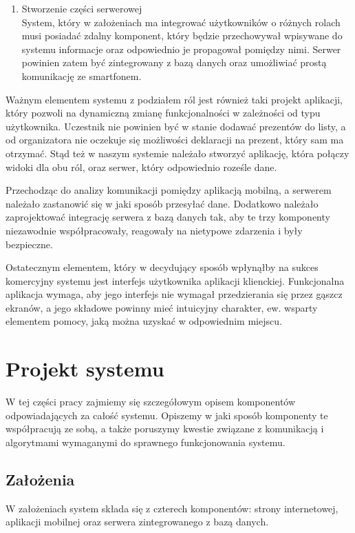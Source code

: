 \documentclass[12pt,titlepage]{article}
\begin{document}
\begin{enumerate}
 \item Stworzenie części serwerowej
 \\ System, który w założeniach ma integrować użytkowników o różnych rolach musi posiadać zdalny komponent, który będzie przechowywał wpisywane do systemu informacje
 oraz odpowiednio je propagował pomiędzy nimi. Serwer powinien zatem być zintegrowany z bazą danych oraz umożliwiać prostą komunikację ze smartfonem.
\end{enumerate}


Ważnym elementem systemu z podziałem ról jest również taki projekt aplikacji, który pozwoli na dynamiczną zmianę funkcjonalności w zależności od typu użytkownika. Uczestnik
nie powinien być w stanie dodawać prezentów do listy, a od organizatora nie oczekuje się możliwości deklaracji na prezent, który sam ma otrzymać. Stąd też w naszym systemie
należało stworzyć aplikację, która połączy widoki dla obu ról, oraz serwer, który odpowiednio roześle dane.

Przechodząc do analizy komunikacji pomiędzy aplikacją mobilną, a serwerem należało zastanowić się w jaki sposób przesyłać dane. Dodatkowo należało zaprojektować integrację
serwera z bazą danych tak, aby te trzy komponenty niezawodnie współpracowały, reagowały na nietypowe zdarzenia i były bezpieczne.

Ostatecznym elementem, który w decydujący sposób wpłynąłby na sukces komercyjny systemu jest interfejs użytkownika aplikacji klienckiej. Funkcjonalna aplikacja wymaga, aby
jego interfejs nie wymagał przedzierania się przez gąszcz ekranów, a jego składowe powinny mieć intuicyjny charakter, ew. wsparty elementem pomocy, jaką można uzyskać w odpowiednim
miejscu.

\newpage
\section{Projekt systemu}
W tej części pracy zajmiemy się szczegółowym opisem komponentów odpowiadających za całość systemu. Opiszemy w jaki sposób komponenty te współpracują ze sobą, a także 
poruszymy kwestie związane z komunikacją i algorytmami wymaganymi do sprawnego funkcjonowania systemu.

\subsection{Założenia}
W założeniach system składa się z czterech komponentów: strony internetowej, aplikacji mobilnej oraz serwera zintegrowanego z bazą danych.
\end{document}
